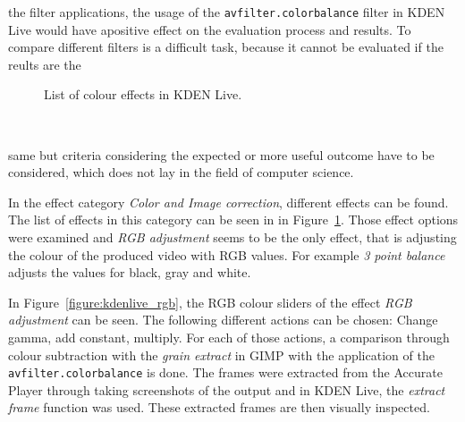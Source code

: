 \documentclass[../MasterThesis.tex]{subfiles}
\begin{document}
\vspace*{-0.8em}

the filter applications, the usage of the \texttt{avfilter.colorbalance} filter in KDEN Live would have apositive effect on the evaluation process and results. To compare different filters is a difficult task, because it cannot be evaluated if the reults are the

\begin{minipage}{0.48\textwidth}
	\vspace*{-0.3em}
	\begin{figure}[H]
	\begin{center}
		\caption[List of colour effects in KDEN Live.]{List of colour effects in KDEN Live.}
		\label{figure:kdenlive_effekte}
	\end{center}
	\end{figure}
	
	
\end{minipage}\begin{minipage}{0.04\textwidth}
	\ 
\end{minipage}\begin{minipage}{0.48\textwidth}

same but criteria considering the expected or more useful outcome have to be considered, which does not lay in the field of computer science.

In the effect category \textit{Color and Image correction}, different effects can be found. The list of effects in this category can be seen in in Figure~\ref{figure:kdenlive_effekte}. Those effect options were examined and \textit{RGB adjustment} seems to be the only effect, that is adjusting the colour of the produced video with RGB values. For example \textit{3 point balance} adjusts the values for black, gray and white.

\end{minipage}

In Figure~\ref{figure:kdenlive_rgb}, the RGB colour sliders of the effect \textit{RGB adjustment} can be seen. The following different actions can be chosen: Change gamma, add constant, multiply. For each of those actions, a comparison through colour subtraction with the \textit{grain extract} in GIMP with the application of the \texttt{avfilter.colorbalance} is done.
The frames were extracted from the Accurate Player through taking screenshots of the output and in KDEN Live, the \textit{extract frame} function was used. These extracted frames are then visually inspected. 
\end{document}
